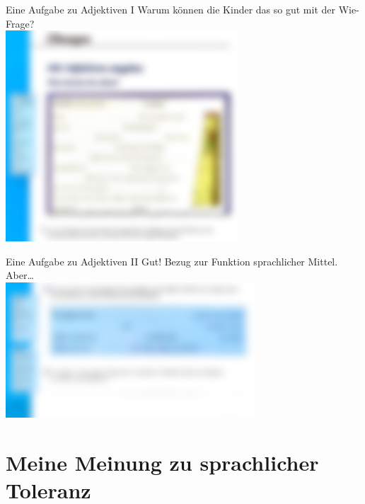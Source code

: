 \begin{frame}
  {Eine Aufgabe zu Adjektiven I}
  \pause
  Warum können die Kinder das so gut mit der Wie-Frage?\\
  \Halbzeile
  \pause
  \centering
  \includegraphics[width=0.65\textwidth]{graphics/adjektive1}
\end{frame}

\begin{frame}
  {Eine Aufgabe zu Adjektiven II}
  Gut! Bezug zur Funktion sprachlicher Mittel. Aber\ldots\\
  \Zeile
  \pause
  \centering
  \includegraphics[width=0.7\textwidth]{graphics/adjektive2}
\end{frame}

\section{Meine Meinung zu sprachlicher Toleranz}

